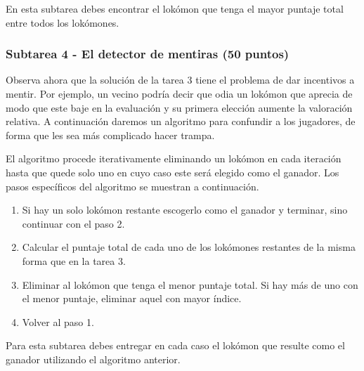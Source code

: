 \documentclass{oci}
\begin{document}
\begin{outputDescription}

En esta subtarea debes encontrar el lokómon que tenga el mayor puntaje total
entre todos los lokómones.

\begin{sampleDescription}
\end{sampleDescription}

\subsubsection*{Subtarea 4 - El detector de mentiras (50 puntos)}

Observa ahora que la solución de la tarea 3 tiene el problema de dar incentivos
a mentir.
Por ejemplo, un vecino podría decir que odia un lokómon que aprecia de
modo que este baje en la evaluación y su primera elección aumente la
valoración relativa. 
A continuación daremos un algoritmo para confundir a los jugadores, de forma que
les sea más complicado hacer trampa.

El algoritmo procede iterativamente eliminando un lokómon en cada iteración
hasta que quede solo uno en cuyo caso este será elegido como el ganador.
Los pasos específicos del algoritmo se muestran a continuación.

\begin{enumerate}
	\item Si hay un solo lokómon restante escogerlo como el ganador y terminar,
    sino continuar con el paso 2.
	\item Calcular el puntaje total de cada uno de los lokómones restantes de
    la misma forma que en la tarea 3.
	\item Eliminar al lokómon que tenga el menor puntaje total.
    Si hay más de uno con el menor puntaje, eliminar aquel con mayor índice. 
	\item Volver al paso 1.
\end{enumerate}

Para esta subtarea debes entregar en cada caso el lokómon que resulte como el
ganador utilizando el algoritmo anterior.

\begin{sampleDescription}
\end{sampleDescription}

\end{outputDescription}
\end{document}

